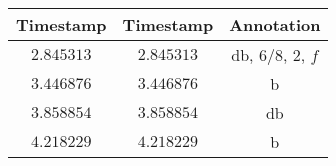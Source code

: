 \begin{tabular}{ccc}
    \textbf{Timestamp} & \textbf{Timestamp} & \textbf{Annotation} \\\hline
    $2.845313$         & $2.845313$         & db, $6/8$, $2$, $f$ \\
    $3.446876$         & $3.446876$         & b                   \\
    $3.858854$         & $3.858854$         & db                  \\
    $4.218229$         & $4.218229$         & b
\end{tabular}
